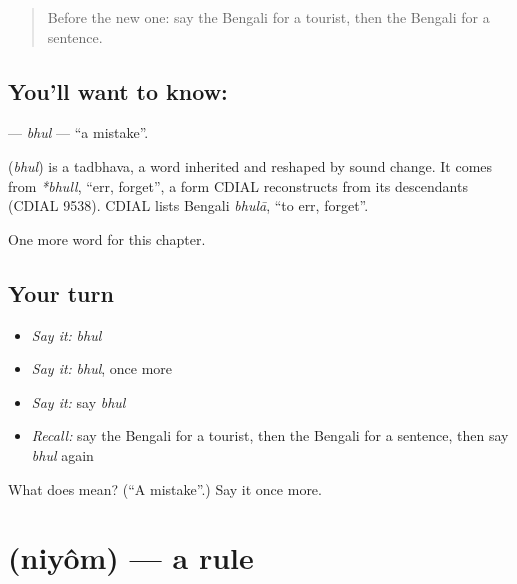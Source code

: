\label{lesson:BN-C199-bhul}



\begin{quote}
Before the new one: say the Bengali for a tourist, then the Bengali for a sentence.
\end{quote}

\subsection*{You'll want to know: }
\textbf{} — \emph{bhul} — \textquotedblleft{}a mistake\textquotedblright{}.

\begin{cousinweb}
\textbf{} (\emph{bhul}) is a tadbhava, a word inherited and reshaped by sound change. It comes from \emph{*bhull}, \textquotedblleft{}err, forget\textquotedblright{}, a form CDIAL reconstructs from its descendants (CDIAL 9538). CDIAL lists Bengali \emph{bhulā}, \textquotedblleft{}to err, forget\textquotedblright{}.
\end{cousinweb}

\begin{grammarlens}[title={What you've built}]
One more word for this chapter.
\end{grammarlens}

\subsection*{Your turn}
\begin{itemize}
\raggedright
  \item \emph{Say it:} \emph{bhul}
  \item \emph{Say it:} \emph{bhul}, once more
  \item \emph{Say it:} say \emph{bhul}
  \item \emph{Recall:} say the Bengali for a tourist, then the Bengali for a sentence, then say \emph{bhul} again
\end{itemize}

\begin{tcolorbox}[breakable,colback=teal!4,colframe=teal!35!black,title={Before you move on}]
What does  mean? (\textquotedblleft{}A mistake\textquotedblright{}.) Say it once more.
\end{tcolorbox}
\section[\texorpdfstring{\bn{নিয়ম} (niyôm)}{নিয়ম (niyôm)}]{ (niyôm) — a rule}

